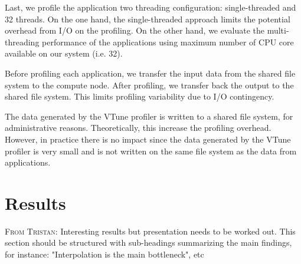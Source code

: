 \documentclass[conference]{IEEEtran}
\newcommand{\TG}[1]{\color{blue}\textsc{From Tristan: }#1\color{black}}
\begin{document}
Last, we profile the application two threading configuration: single-threaded and 32 threads. On the one hand, the single-threaded approach limits the potential overhead from I/O on the profiling. On the other hand, we evaluate the multi-threading performance of the applications using maximum number of CPU core available on our system (i.e. 32).

Before profiling each application, we transfer the input data from the shared file system to the compute node. After profiling, we transfer back the output to the shared file system. This limits profiling variability due to I/O contingency.

The data generated by the VTune profiler is written to a shared file system, for administrative reasons. Theoretically, this increase the profiling overhead. However, in practice there is no impact since the data generated by the VTune profiler is very small and is not written on the same file system as the data from applications.

\section{Results}
\TG{Interesting results but presentation needs to be worked out. This section should be structured with sub-headings summarizing the main findings, for instance: "Interpolation is the main bottleneck", etc}


\end{document}

